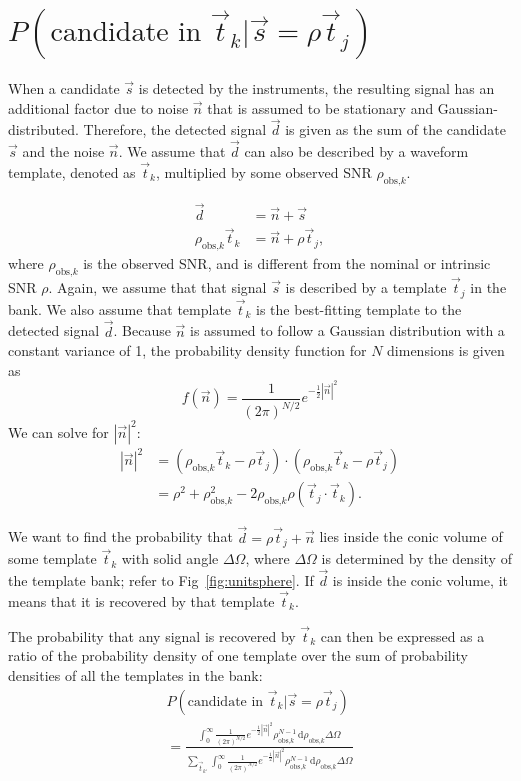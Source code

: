 \documentclass[twocolumn,showpacs,unsortedaddress,superscriptaddress,showkeys,nofootinbib,preprintnumbers,letterpaper]{revtex4-1}
\newcommand*{\diff}{\,\mathrm{d}}
\newcommand{\ptjtk}{\rho(\vec{t}_j\cdot\vec{t}_k)}
\newcommand{\rhok}{\rho_{\text{obs,$k$}}}
\begin{document}
\section{$P(\text{candidate in }\vec{t}_k|\vec{s}=\rho\vec{t}_j)$} \label{sec:P_k}

When a candidate $\vec{s}$ is detected by the instruments, the resulting signal has an additional factor due to noise $\vec{n}$ that is assumed to be stationary and Gaussian-distributed. Therefore, the detected signal $\vec{d}$ is given as the sum of the candidate $\vec{s}$ and the noise $\vec{n}$. We assume that $\vec{d}$ can also be described by a waveform template, denoted as $\vec{t}_k$, multiplied by some observed SNR $\rhok$.

   \begin{align}
   \vec{d} &= \vec{n} + \vec{s} \\
   \rhok\vec{t}_k &= \vec{n} + \rho\vec{t}_j,
   \end{align}
where $\rhok$ is the observed SNR, and is different from the nominal or intrinsic SNR $\rho$. Again, we assume that that signal $\vec{s}$ is described by a template $\vec{t}_j$ in the bank. We also assume that template $\vec{t}_k$ is the best-fitting template to the detected signal $\vec{d}$. Because $\vec{n}$ is assumed to follow a Gaussian distribution with a constant variance of 1, the probability density function for $N$ dimensions is given as
   \begin{equation}
   f(\vec{n}) = \frac{1}{(2\pi)^{N/2}}e^{-\frac{1}{2}|\vec{n}|^2}
   \end{equation}
We can solve for $|\vec{n}|^2$: 
   \begin{align}
   |\vec{n}|^2 &= (\rhok\vec{t}_k - \rho\vec{t}_j) \cdot (\rhok\vec{t}_k - \rho\vec{t}_j)\\
               &= \rho^2 + \rhok^2 - 2\rhok\ptjtk.
   \label{eqn:n_squaredmagnitude}
   \end{align}

We want to find the probability that $\vec{d}=\rho\vec{t}_j+\vec{n}$ lies inside the conic volume of some template $\vec{t}_k$ with solid angle $\Delta\Omega$, where $\Delta\Omega$ is determined by the density of the template bank; refer to Fig~\ref{fig:unitsphere}. If $\vec{d}$ is inside the conic volume, it means that it is recovered by that template $\vec{t}_k$.

The probability that any signal is recovered by $\vec{t}_k$ can then be expressed as a ratio of the probability density of one template over the sum of probability densities of all the templates in the bank:
   \begin{multline}
   \label{eqn:prob_s_recovered_by_tk}
   P(\text{candidate in }\vec{t}_k|\vec{s}=\rho\vec{t}_j) \\= \frac{\int_0^\infty \frac{1}{(2\pi)^{N/2}} e^{-\frac{1}{2} |\vec{n}|^2} {\rhok^{N-1}} \diff\rhok \Delta\Omega}
   {\sum_{\vec{t}_{k'}} \int_0^\infty \frac{1}{(2\pi)^{N/2}} e^{-\frac{1}{2} |\vec{n}|^2} {\rhok^{N-1}} \diff\rhok \Delta\Omega}
   \end{multline}
\end{document}
